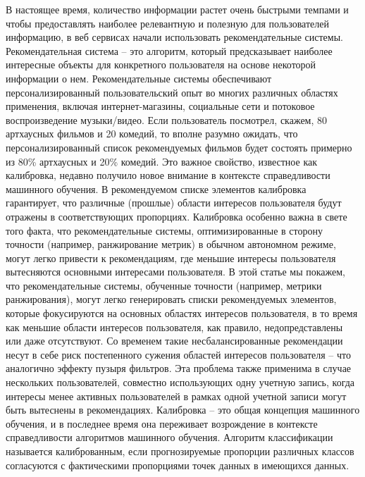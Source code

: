 \documentclass[a4paper,article,14pt]{extarticle}
\begin{document}




В настоящее время, количество информации растет очень быстрыми темпами и чтобы предоставлять наиболее релевантную и полезную для пользователей информацию, 
в веб сервисах начали использовать рекомендательные системы. Рекомендательная система -- это алгоритм, который предсказывает наиболее интересные
 объекты для конкретного пользователя на основе некоторой информации о нем.
 Рекомендательные системы обеспечивают персонализированный пользовательский опыт во многих различных областях применения, включая интернет-магазины, социальные сети и потоковое воспроизведение музыки/видео. 
 Если пользователь посмотрел, скажем, 80 артхаусных фильмов и 20 комедий, то вполне разумно ожидать, что персонализированный список рекомендуемых фильмов будет состоять примерно из 80\% артхаусных и 20\% комедий. Это важное свойство, известное как калибровка, недавно получило новое внимание в контексте справедливости машинного обучения. В рекомендуемом списке элементов калибровка гарантирует, что различные (прошлые) области интересов пользователя будут отражены в соответствующих пропорциях. Калибровка особенно важна в свете того факта, что рекомендательные системы, оптимизированные в сторону точности (например, ранжирование метрик) в обычном автономном режиме, могут легко привести к рекомендациям, где меньшие интересы пользователя вытесняются основными интересами пользователя.
 В этой статье мы покажем, что рекомендательные системы, обученные точности (например, метрики ранжирования), могут легко генерировать списки рекомендуемых элементов, которые фокусируются на основных областях интересов пользователя, в то время как меньшие области интересов пользователя, как правило, недопредставлены или даже отсутствуют. 
 Со временем такие несбалансированные рекомендации несут в себе риск постепенного сужения областей интересов пользователя -- что аналогично эффекту пузыря фильтров. Эта проблема также применима в случае нескольких пользователей, совместно использующих одну учетную запись, когда интересы менее активных пользователей в рамках одной учетной записи могут быть вытеснены в рекомендациях.
 Калибровка -- это общая концепция машинного обучения, и в последнее время она переживает возрождение в контексте справедливости алгоритмов машинного обучения. Алгоритм классификации называется калиброванным, если прогнозируемые пропорции различных классов согласуются с фактическими пропорциями точек данных в имеющихся данных. 
\end{document}
